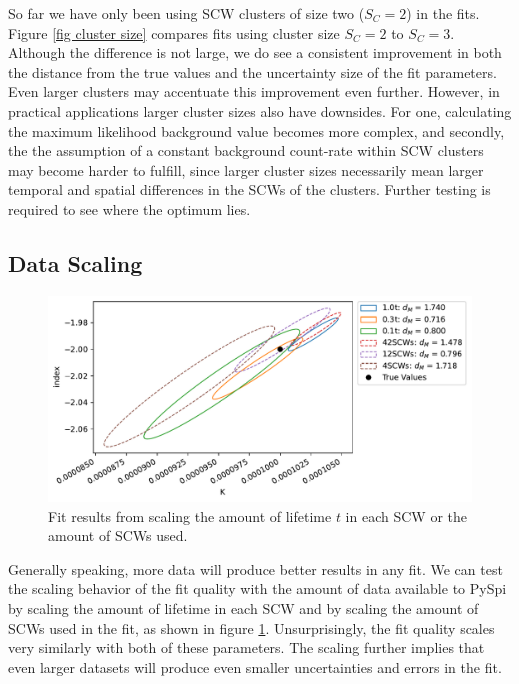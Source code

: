\documentclass{article}
\begin{document}
So far we have only been using SCW clusters of size two ($S_C=2$) in the fits. Figure \ref{fig cluster size} compares fits using cluster size $S_C=2$ to $S_C=3$. Although the difference is not large, we do see a consistent improvement in both the distance from the true values and the uncertainty size of the fit parameters. Even larger clusters may accentuate this improvement even further. However, in practical applications larger cluster sizes also have downsides. For one, calculating the maximum likelihood background value becomes more complex, and secondly, the the assumption of a constant background count-rate within SCW clusters may become harder to fulfill, since larger cluster sizes necessarily mean larger temporal and spatial differences in the SCWs of the clusters. Further testing is required to see where the optimum lies.

\FloatBarrier

\subsection{Data Scaling}

\begin{figure}[h]
    \centering
    \includegraphics[width=\textwidth]{Images/data_scaling.pdf}
    \caption{Fit results from scaling the amount of lifetime $t$ in each SCW or the amount of SCWs used.}
    \label{fig data scaling}
\end{figure}

Generally speaking, more data will produce better results in any fit. We can test the scaling behavior of the fit quality with the amount of data available to PySpi by scaling the amount of lifetime in each SCW and by scaling the amount of SCWs used in the fit, as shown in figure \ref{fig data scaling}. Unsurprisingly, the fit quality scales very similarly with both of these parameters. The scaling further implies that even larger datasets will produce even smaller uncertainties and errors in the fit. 
\end{document}
